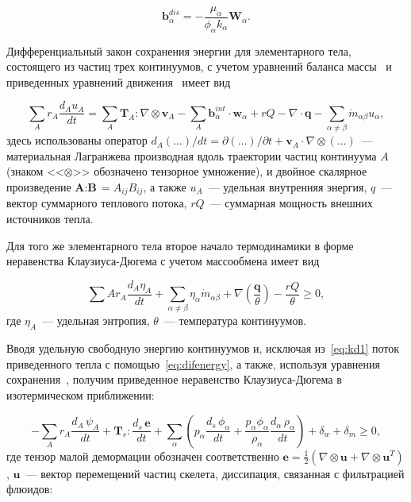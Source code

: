\begin{equation}
  \label{eq:bdis}
  \textbf{b}^{dis}_{\alpha} = - \frac{\mu_{\alpha}}{\phi_{\alpha} k_{\alpha}} \textbf{W}_{\alpha}.
\end{equation}

Дифференциальный закон сохранения энергии для элементарного тела, состоящего из частиц трех континуумов, с учетом уравнений баланса массы~ и приведенных уравнений движения~ имеет вид

\begin{equation}
  \label{eq:difenergy}
  \sum_A{r_A \frac{d_A u_A}{dt}} = \sum_A{\textbf{T}_A : \nabla \otimes \textbf{v}_A} - \sum_A{\textbf{b}^{int}_{\alpha} \cdot \textbf{w}_{\alpha}} + rQ - \nabla \cdot \textbf{q} - \sum_{\alpha \neq \beta}{\dot{m}_{\alpha \beta} u_{\alpha}},
\end{equation}
здесь использованы оператор $d_A (\dots)/dt = \partial (\dots)/ \partial t + {\textbf{v}}_A \cdot \nabla \otimes (\dots)$~--- материальная Лагранжева производная вдоль траектории частиц континуума $A$ (знаком <<$\otimes$>> обозначено тензорное умножение), и двойное скалярное произведение ${\textbf{A} : \textbf{B}} = A_{ij} B_{ij}$, а также $u_A$~--- удельная внутренняя энергия, $q$~--- вектор суммарного теплового потока, $rQ$~--- суммарная мощность внешних источников тепла.

Для того же элементарного тела второе начало термодинамики в форме неравенства Клаузиуса-Дюгема с учетом массообмена имеет вид

\begin{equation}
  \label{eq:kd1}
  \sum{A}{r_A \frac{d_A \eta_A}{dt}}
  + \sum_{\alpha \neq \beta} {\eta_{\alpha} \dot{m}_{\alpha \beta}} + \nabla \left( \frac{\textbf{q}}{\theta} \right)  - \frac{rQ}{\theta} \geq 0,
\end{equation}
где $\eta_A$~--- удельная энтропия, $\theta$~--- температура континуумов.

Вводя удельную свободную энергию континуумов  и, исключая из~\eqref{eq:kd1} поток приведенного тепла с помощью~\eqref{eq:difenergy}, а также, используя уравнения сохранения~, получим приведенное неравенство Клаузиуса-Дюгема в изотермическом приближении:

\begin{equation}
  \label{eq:kdpriv}
  - \sum_A{r_A \frac{d_A \, \psi_A}{d t }}
  + {\textbf{T}}_{s} : \frac{d_s \, \textbf{e}}{d t } + \sum_{\alpha}{\left( p_{\alpha} \frac{d_s \, \phi_{\alpha}}{d t } + \frac{p_{\alpha} \phi_{\alpha}}{\rho_{\alpha}} \frac{d_{\alpha} \, \rho_{\alpha}}{d t} \right)} + \delta_w + \delta_m \geq 0,
\end{equation}
где тензор малой демормации обозначен соответственно $\textbf{e} = \frac{1}{2} (\nabla \otimes \textbf{u} + \nabla \otimes \textbf{u}^T)$, $\textbf{u}$~--- вектор перемещений частиц скелета, диссипация, связанная с фильтрацией флюидов:

